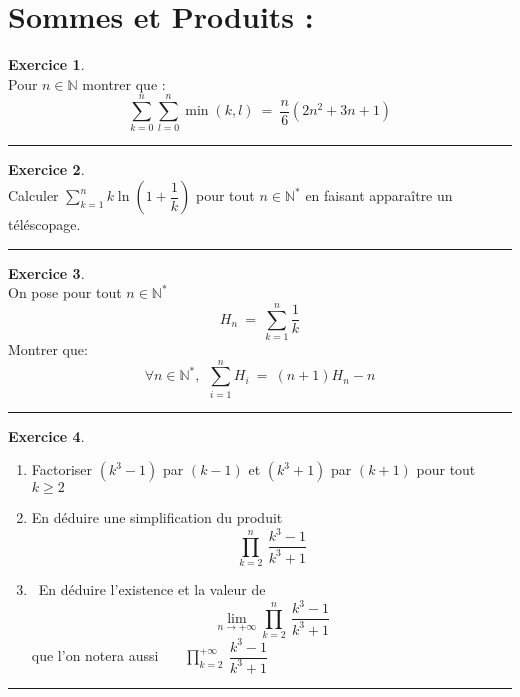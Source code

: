 \documentclass[10pt,a4paper]{article}
\newcommand{\N}{\mathbb{N}}
\theoremstyle{definition}
\theoremstyle{definition}
\newtheorem{exo}{Exercice}
\begin{document}
\section*{Sommes et Produits :}
\begin{center}
\begin{minipage}[t]{0.47\linewidth}
\raggedright

\begin{exo}\quad\\
Pour $n\in\N$ montrer que : 
$$\sum\limits_{k=0}^{n}\sum\limits_{l=0}^{n} \min(k,l) \ = \ \dfrac{n}{6}\left(2n^2+3n+1\right)$$
\end{exo}
\begin{center}
\rule{1\linewidth}{0.6pt}
\end{center} 

\begin{exo}\quad\\ 
Calculer $\sum\limits_{k=1}^{n} k \ln\left(1+\dfrac{1}{k}\right)$ pour tout     $n\in\N^*$ en faisant apparaître un téléscopage.
\end{exo}
\begin{center}
\rule{1\linewidth}{0.6pt}
\end{center}

\begin{exo}\quad\\
On pose pour tout $n\in\N^*$ 
$$ H_n  \ = \ \sum_{k=1}^{n} \dfrac{1}{k}$$
Montrer que:  
$$\forall n\in\N^* , \  \ \sum_{i=1}^{n} H_i  \ = \ (n+1)H_n - n$$
\end{exo}
\begin{center}
\rule{1\linewidth}{0.6pt}
\end{center}

\end{minipage}	
\hfill\vrule\hfill
\begin{minipage}[t]{0.47\linewidth}
\raggedright


\begin{exo}\quad\\
\begin{enumerate}
\item Factoriser $(k^3-1)$ par $(k-1)$ et $(k^3+1)$ par $(k+1)$ pour tout $k\geq 2$
\item En déduire une simplification du produit 
$$\prod\limits_{k=2}^{n}~\dfrac{k^3-1}{k^3+1}$$
\item~En déduire l'existence et la valeur de $$\lim\limits_{n \rightarrow +\infty} \prod\limits_{k=2}^{n}~\dfrac{k^3-1}{k^3+1} $$ que l'on notera aussi~~~ $\prod\limits_{k=2}^{+\infty}~\dfrac{k^3-1}{k^3+1}$
\end{enumerate}
\end{exo}
\begin{center}
\rule{1\linewidth}{0.6pt}
\end{center}


\end{minipage}
\end{center}
\end{document}
